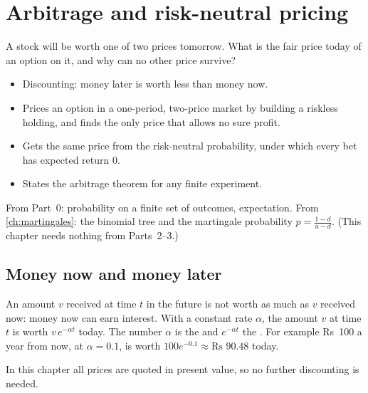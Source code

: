 \chapter{Arbitrage and risk-neutral pricing}
\label{ch:arbitrage}

\begin{question}
A stock will be worth one of two prices tomorrow. What is the fair price today of an option on it, and why can no other price survive?
\end{question}

\begin{whatfor}
\begin{itemize}
  \item Discounting: money later is worth less than money now.
  \item Prices an option in a one-period, two-price market by building a riskless holding, and finds the only price that allows no sure profit.
  \item Gets the same price from the risk-neutral probability, under which every bet has expected return $0$.
  \item States the arbitrage theorem for any finite experiment.
\end{itemize}
\end{whatfor}

\begin{prereq}
From Part~0: probability on a finite set of outcomes, expectation. From \cref{ch:martingales}: the binomial tree and the martingale probability $p=\frac{1-d}{u-d}$. (This chapter needs nothing from Parts~2--3.)
\end{prereq}

\section{Money now and money later}

An amount $v$ received at time $t$ in the future is not worth as much as $v$ received now: money now can earn interest. With a constant rate $\alpha$, the amount $v$ at time $t$ is worth $v\,e^{-\alpha t}$ today. The number $\alpha$ is the  and $e^{-\alpha t}$ the . For example Rs~100 a year from now, at $\alpha=0.1$, is worth $100e^{-0.1}\approx\text{Rs }90.48$ today.

In this chapter all prices are quoted in present value, so no further discounting is needed.

